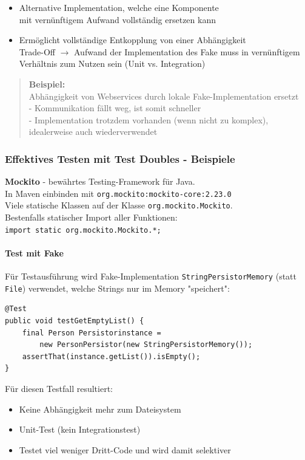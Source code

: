 \documentclass[a4paper]{article}
\begin{document}
				\begin{itemize}
					\item Alternative Implementation, welche eine Komponente \\
					mit vernünftigem Aufwand vollständig ersetzen kann
					\item Ermöglicht vollständige Entkopplung von einer Abhängigkeit\\
						Trade-Off $\rightarrow$ Aufwand der Implementation des Fake muss in vernünftigem Verhältnis zum Nutzen sein (Unit vs. Integration)
				\end{itemize}
				\begin{quote}
					\textbf{Beispiel:}\\
					Abhängigkeit von Webservices durch lokale Fake-Implementation ersetzt\\
					- Kommunikation fällt weg, ist somit schneller\\
					- Implementation trotzdem vorhanden (wenn nicht zu komplex), \\
					idealerweise auch wiederverwendet
				\end{quote}
		
		\subsubsection{Effektives Testen mit Test Doubles - Beispiele}
		
		\textbf{Mockito} - bewährtes Testing-Framework für Java.\\
		In Maven einbinden mit \texttt{org.mockito:mockito-core:2.23.0}\\
		Viele statische Klassen auf der Klasse \texttt{org.mockito.Mockito}.\\
		Bestenfalls statischer Import aller Funktionen:\\
		\texttt{import static org.mockito.Mockito.*;}
		
		\paragraph{Test mit Fake}
		
			Für Testausführung wird Fake-Implementation \texttt{StringPersistorMemory} (statt \texttt{File}) verwendet, welche Strings nur im Memory "speichert":
			
			\begin{lstlisting}
@Test
public void testGetEmptyList() {
	final Person Persistorinstance = 
		new PersonPersistor(new StringPersistorMemory());
	assertThat(instance.getList()).isEmpty();
}
			\end{lstlisting}
			\noindent
			Für diesen Testfall resultiert:
			\begin{itemize}
				\item Keine Abhängigkeit mehr zum Dateisystem
				\item Unit-Test (kein Integrationstest)
				\item Testet viel weniger Dritt-Code und wird damit selektiver
			\end{itemize}
		
\end{document}
